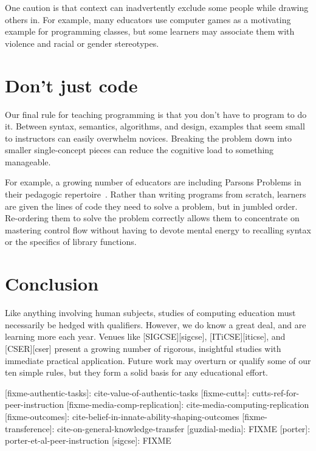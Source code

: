 \documentclass{article}
\begin{document}
One caution is that context can inadvertently exclude some people while drawing others in.
For example,
many educators use computer games as a motivating example for programming classes,
but some learners may associate them with violence and racial or gender stereotypes.

\section{Don't just code}

Our final rule for teaching programming is that you don't have to program to do it.
Between syntax, semantics, algorithms, and design,
examples that seem small to instructors can easily overwhelm novices.
Breaking the problem down into smaller single-concept pieces can reduce the cognitive load to something manageable.

For example,
a growing number of educators are including Parsons Problems in their pedagogic repertoire~\citep{parsons,morrison-parsons}.
Rather than writing programs from scratch,
learners are given the lines of code they need to solve a problem,
but in jumbled order.
Re-ordering them to solve the problem correctly allows them to concentrate on mastering control flow
without having to devote mental energy to recalling syntax
or the specifics of library functions.

\section*{Conclusion}

Like anything involving human subjects,
studies of computing education must necessarily be hedged with qualifiers.
However,
we do know a great deal,
and are learning more each year.
Venues like [SIGCSE][sigcse],
[ITiCSE][iticse],
and [CSER][cser]
present a growing number of rigorous, insightful studies
with immediate practical application.
Future work may overturn or qualify some of our ten simple rules,
but they form a solid basis for any educational effort.

[fixme-authentic-tasks]: cite-value-of-authentic-tasks
[fixme-cutts]: cutts-ref-for-peer-instruction
[fixme-media-comp-replication]: cite-media-computing-replication
[fixme-outcomes]: cite-belief-in-innate-ability-shaping-outcomes
[fixme-transference]: cite-on-general-knowledge-transfer
[guzdial-media]: FIXME
[porter]: porter-et-al-peer-instruction
[sigcse]: FIXME



\end{document}
